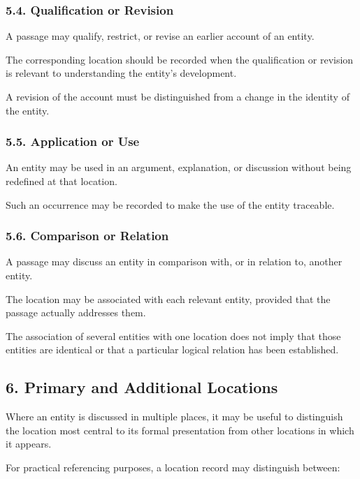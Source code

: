 \subsubsection*{5.4. Qualification or Revision}

A passage may qualify, restrict,
or revise an earlier account
of an entity.

The corresponding location
should be recorded when the
qualification or revision
is relevant to understanding
the entity's development.

A revision of the account must
be distinguished from a change
in the identity of the entity.

\subsubsection*{5.5. Application or Use}

An entity may be used in an
argument, explanation, or
discussion without being
redefined at that location.

Such an occurrence may be
recorded to make the use
of the entity traceable.

\subsubsection*{5.6. Comparison or Relation}

A passage may discuss an entity
in comparison with, or in relation
to, another entity.

The location may be associated
with each relevant entity,
provided that the passage
actually addresses them.

The association of several
entities with one location
does not imply that those
entities are identical or
that a particular logical
relation has been established.


\subsection*{6. Primary and Additional Locations}

Where an entity is discussed
in multiple places, it may
be useful to distinguish
the location most central
to its formal presentation
from other locations in
which it appears.

For practical referencing
purposes, a location record
may distinguish between:

